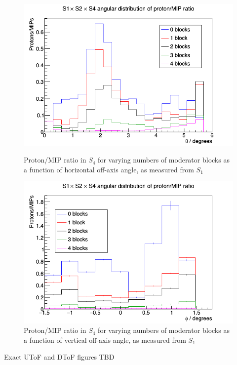    	\begin{figure}[ht]
   		\begin{minipage}[t]{0.48\textwidth}
   			\centering
   			\includegraphics[width=\textwidth]{files/Figures/ratioS4Horz}
   			\caption{Proton/MIP ratio in $S_{4}$ for varying numbers of moderator blocks as a function of horizontal off-axis angle, as measured from $S_{1}$}
   			\label{fig:propiratio_s4_horz}
   		\end{minipage}
   		\hspace{0.3cm}
    	\begin{minipage}[t]{0.48\textwidth}
    		\centering
    		\includegraphics[width=\textwidth]{files/Figures/ratioS4Vert}
    		\caption{Proton/MIP ratio in $S_{4}$ for varying numbers of moderator blocks as a function of vertical off-axis angle, as measured from $S_{1}$}
    		\label{fig:propiratio_s4_vert}
    	\end{minipage}	
   	\end{figure}
   
	

Exact UToF and DToF figures TBD